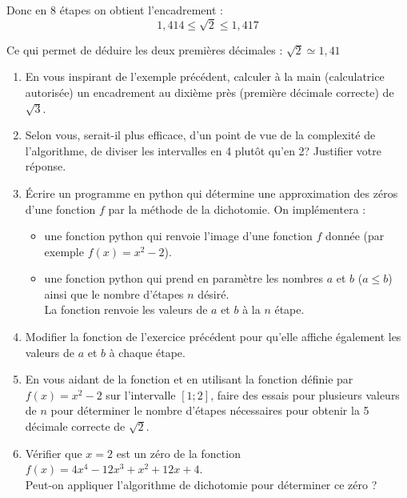 Donc en $8$ étapes on obtient l'encadrement :
$$1,414  \leqslant \sqrt{2} \leqslant 1,417$$

Ce qui permet de déduire les deux premières décimales :
$\sqrt{2}\simeq 1,41$


\bigskip
\begin{boxexstheorieligne}
\begin{enumerate}[label=\textbf{E\thechapter.\arabic*},itemsep=4mm,series=refexercices]
\item En vous inspirant de l'exemple précédent, calculer à la main (calculatrice autorisée) un encadrement au dixième près (première décimale correcte) de $\sqrt{3}$.
\item Selon vous, serait-il plus efficace, d'un point de vue de la complexité de l'algorithme, de diviser les intervalles en 4 plutôt qu'en 2? Justifier votre réponse.
\item Écrire un programme en python qui détermine une approximation des zéros d'une fonction $f$ par la méthode de la dichotomie. On implémentera :
\vspace{-1mm} 
\begin{itemize}
\item une fonction python qui renvoie l'image d'une fonction $f$ donnée ({\small par exemple $f(x)=x^2-2$}).
\item une fonction python  qui prend en paramètre les nombres $a$ et $b$ ($a\leqslant b$) ainsi que le nombre d'étapes $n$ désiré.\\
La fonction renvoie les valeurs de $a$ et $b$ à la $n$ étape.
\end{itemize}
\item Modifier la fonction  de l'exercice précédent pour qu'elle affiche également les valeurs de $a$ et $b$ à chaque étape.
\item\label{dicho_racine_2} En vous aidant de la fonction  et en utilisant la fonction définie par $f(x)=x^2-2$ sur l'intervalle $[1;2]$, faire des essais pour plusieurs valeurs de $n$ pour déterminer le nombre d'étapes nécessaires pour obtenir la 5 décimale correcte de $\sqrt{2}$.
\item Vérifier que $x=2$ est un zéro de la fonction $f(x)=4x^4-12x^3+x^2+12x+4$.\\
Peut-on appliquer l'algorithme de dichotomie pour déterminer ce zéro ? 
\end{enumerate}
\end{boxexstheorieligne}



